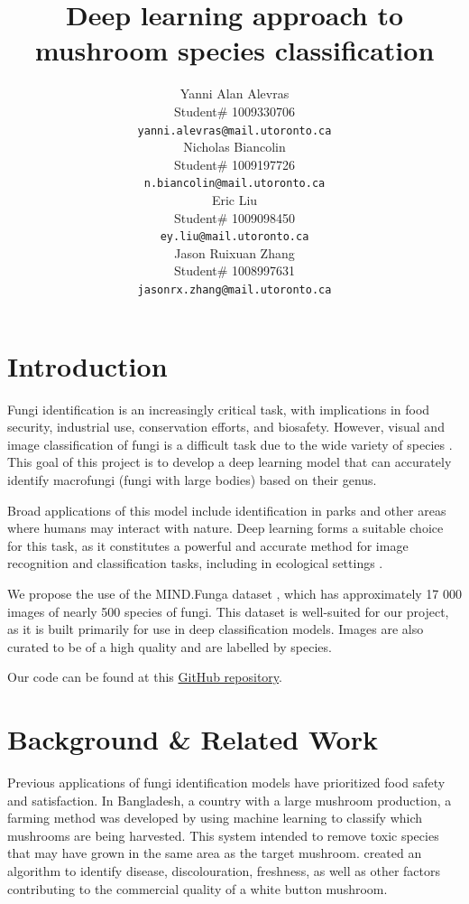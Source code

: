 \documentclass{article} %
\title{Deep learning approach to  \\ 
mushroom species classification}
\author{Yanni Alan Alevras  \\
Student\# 1009330706 \\
\texttt{yanni.alevras@mail.utoronto.ca} \\
\And
Nicholas Biancolin  \\
Student\# 1009197726 \\
\texttt{n.biancolin@mail.utoronto.ca} \\
\AND
Eric Liu  \\
Student\# 1009098450 \\
\texttt{ey.liu@mail.utoronto.ca} \\
\And
Jason Ruixuan Zhang \\
Student\# 1008997631 \\
\texttt{jasonrx.zhang@mail.utoronto.ca} \\
\AND
}
\begin{document}
\maketitle

\section{Introduction}
\label{intro}

Fungi identification is an increasingly critical task, with implications in food security, industrial use, conservation efforts, and biosafety. However, visual and image classification of fungi is a difficult task due to the wide variety of species \citep{LuckingAimeEtAl.UnambiguousIdentificationFungi.2020}. This goal of this project is to develop a deep learning model that can accurately identify macrofungi (fungi with large bodies) based on their genus.

Broad applications of this model include identification in parks and other areas where humans may interact with nature. Deep learning forms a suitable choice for this task, as it constitutes a powerful and accurate method for image recognition and classification tasks, including in ecological settings \citep{SchneiderTaylorEtAl.PresentFutureApproaches.2019}.

We propose the use of the MIND.Funga dataset \citep{Drechsler-SantosKarstedtEtAl.MINDFunga.2023}, which has approximately 17 000 images of nearly 500 species of fungi. This dataset is well-suited for our project, as it is built primarily for use in deep classification models. Images are also curated to be of a high quality and are labelled by species.

Our code can be found at this \href{https://github.com/nbiancolin/convolutional-neural-nuts}{GitHub repository}.

\section{Background \& Related Work}
\label{bg_related}

Previous applications of fungi identification models have prioritized food safety and satisfaction. In Bangladesh, a country with a large mushroom production, a farming method was developed by \cite{RahmanFaruqEtAl.IoTEnabledMushroom.2022} using machine learning to classify which mushrooms are being harvested. This system intended to remove toxic species that may have grown in the same area as the target mushroom. \cite{WangZhengEtAl.AutomaticSortingSystem.2018} created an algorithm to identify disease, discolouration, freshness, as well as other factors contributing to the commercial quality of a white button mushroom.
\end{document}
